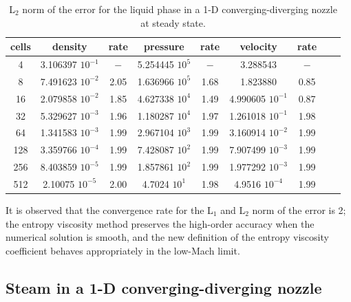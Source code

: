 %
%
\begin{table}[H]
\begin{center}
 \caption{\label{tbl:l2_norm_liq} L$_2$ norm of the error for the liquid phase in a 1-D converging-diverging nozzle at steady state.}
 \begin{tabular}{|c|c|c|c|c|c|c|c|c|}
 \hline
cells& density            & rate & pressure          & rate & velocity           & rate \\ \hline
4    & 3.106397 $10^{-1}$ & $-$  & 5.254445 $10^{5}$ & $-$  & 3.288543           & $-$  \\ \hline
8    & 7.491623 $10^{-2}$ & 2.05 & 1.636966 $10^{5}$ & 1.68 & 1.823880           & 0.85 \\ \hline
16   & 2.079858 $10^{-2}$ & 1.85 & 4.627338 $10^{4}$ & 1.49 & 4.990605 $10^{-1}$ & 0.87 \\ \hline
32   & 5.329627 $10^{-3}$ & 1.96 & 1.180287 $10^{4}$ & 1.97 & 1.261018 $10^{-1}$ & 1.98 \\ \hline
64   & 1.341583 $10^{-3}$ & 1.99 & 2.967104 $10^{3}$ & 1.99 & 3.160914 $10^{-2}$ & 1.99 \\ \hline
128  & 3.359766 $10^{-4}$ & 1.99 & 7.428087 $10^{2}$ & 1.99 & 7.907499 $10^{-3}$ & 1.99 \\ \hline
256  & 8.403859 $10^{-5}$ & 1.99 & 1.857861 $10^{2}$ & 1.99 & 1.977292 $10^{-3}$ & 1.99 \\ \hline
512  & 2.10075  $10^{-5}$ & 2.00 & 4.7024   $10^{1}$ & 1.98 & 4.9516   $10^{-4}$ & 1.99 \\ \hline
\end{tabular}
\end{center}
\end{table}
It is observed that the convergence rate for the L$_1$ and L$_2$ norm of the error is 2; the entropy viscosity method preserves the high-order accuracy when the numerical solution is smooth, and the new definition of the entropy viscosity coefficient behaves appropriately in the low-Mach limit.

\subsection{Steam in a 1-D converging-diverging nozzle} \label{sec:steam_nozzle}

